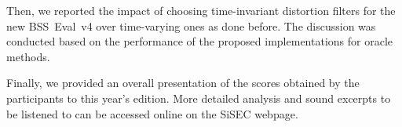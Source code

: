 \documentclass{llncs}
\begin{document}
Then, we reported the impact of choosing time-invariant distortion filters for the new BSS~Eval~v4 over time-varying ones as done before. The discussion was conducted based on the performance of the proposed implementations for oracle methods.

Finally, we provided an overall presentation of the scores obtained by the participants to this year's edition. More detailed analysis and sound excerpts to be listened to can be accessed online on the SiSEC webpage.
\footnotesize


\end{document}
